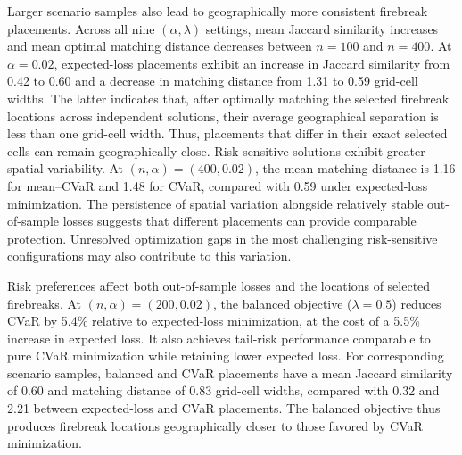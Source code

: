 \documentclass{itor}
\begin{document}
Larger scenario samples also lead to geographically more consistent
firebreak placements. Across all nine $(\alpha,\lambda)$ settings,
mean Jaccard similarity increases and mean optimal matching
distance decreases between $n=100$ and $n=400$. At $\alpha=0.02$,
expected-loss placements exhibit an increase in Jaccard similarity
from 0.42 to 0.60 and a decrease in matching distance from
1.31 to 0.59 grid-cell widths. The latter indicates that, after optimally matching the selected firebreak locations across independent solutions, their average geographical separation is less than one grid-cell width. Thus, placements that differ in
their exact selected cells can remain geographically close.
Risk-sensitive solutions exhibit greater spatial variability.
At $(n,\alpha)=(400,0.02)$, the mean matching distance is 1.16
for mean--CVaR and 1.48 for CVaR, compared with 0.59 under
expected-loss minimization. The persistence of spatial variation
alongside relatively stable out-of-sample losses suggests that
different placements can provide comparable protection.
Unresolved optimization gaps in the most challenging
risk-sensitive configurations may also contribute to this variation.

Risk preferences affect both out-of-sample losses and the locations
of selected firebreaks. At $(n,\alpha)=(200,0.02)$, the balanced
objective ($\lambda=0.5$) reduces CVaR by 5.4\% relative to
expected-loss minimization, at the cost of a 5.5\% increase in
expected loss. It also achieves tail-risk performance comparable
to pure CVaR minimization while retaining lower expected loss.
For corresponding scenario samples, balanced and CVaR placements
have a mean Jaccard similarity of 0.60 and matching distance of
0.83 grid-cell widths, compared with 0.32 and 2.21 between
expected-loss and CVaR placements. The balanced objective thus
produces firebreak locations geographically closer to those
favored by CVaR minimization.



\end{document}
